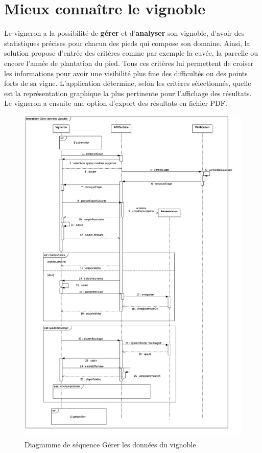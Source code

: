 \documentclass[a4paper, titlepage]{report}
\begin{document}
\section{Mieux connaître le vignoble}

Le vigneron a la possibilité de \textbf{gérer} et d'\textbf{analyser} son vignoble, d'avoir des
statistiques précises pour chacun des pieds qui compose son domaine.
Ainsi, la solution propose d'entrée des critères comme par exemple la
cuvée, la parcelle ou encore l'année de plantation du pied. Tous ces
critères lui permettent de croiser les informations pour avoir une
visibilité plus fine des difficultés ou des points forts de sa vigne.
L'application détermine, selon les critères sélectionnés, quelle est la
représentation graphique la plus pertinente pour l'affichage des
résultats. Le vigneron a ensuite une option d'export des résultats en
fichier PDF.

\begin{figure}[!h]
\centering
\includegraphics{Images/SequenceDiagramGererDonneesVignoble}
\caption{Diagramme de séquence Gérer les données du vignoble}
\end{figure}
\end{document}
